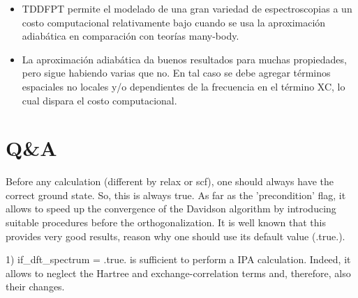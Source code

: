   \begin{itemize}
    \item TDDFPT permite el modelado de una gran variedad de espectroscopias a un costo computacional relativamente bajo cuando se usa la aproximación adiabática en comparación con teorías many-body.
    \item La aproximación adiabática da buenos resultados para muchas propiedades, pero sigue habiendo varias que no. En tal caso se debe agregar términos espaciales no locales y/o dependientes de la frecuencia en el término XC, lo cual dispara el costo computacional.
  \end{itemize}

\section{Q\&A}


  Before any calculation (different by relax or scf), one should always have the correct ground state. So, this is always true. As far as the 'precondition' flag, it allows to speed up the convergence of the Davidson algorithm by introducing suitable procedures before the orthogonalization. It is well known that this provides very good results, reason why one should use its default value (.true.).


  1) if\_dft\_spectrum = .true. is sufficient to perform a IPA calculation. Indeed, it allows to neglect the Hartree and exchange-correlation terms and, therefore, also their changes.

